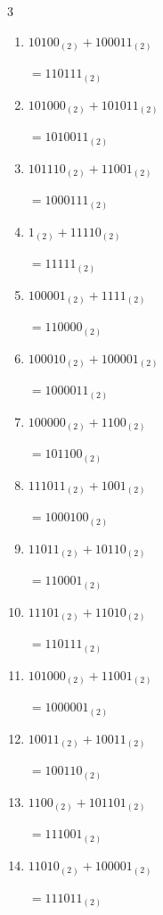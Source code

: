\begin{multicols}{3}
\begin{enumerate}
  \item $10100_{(2)} + 100011_{(2)}$

        $=110111_{(2)}$

  \item $101000_{(2)} + 101011_{(2)}$

        $=1010011_{(2)}$

  \item $101110_{(2)} + 11001_{(2)}$

        $=1000111_{(2)}$

  \item $1_{(2)} + 11110_{(2)}$

        $=11111_{(2)}$

  \item $100001_{(2)} + 1111_{(2)}$

        $=110000_{(2)}$

  \item $100010_{(2)} + 100001_{(2)}$

        $=1000011_{(2)}$

  \item $100000_{(2)} + 1100_{(2)}$

        $=101100_{(2)}$

  \item $111011_{(2)} + 1001_{(2)}$

        $=1000100_{(2)}$

\columnbreak %

  \item $11011_{(2)} + 10110_{(2)}$

        $=110001_{(2)}$

  \item $11101_{(2)} + 11010_{(2)}$

        $=110111_{(2)}$

  \item $101000_{(2)} + 11001_{(2)}$

        $=1000001_{(2)}$

  \item $10011_{(2)} + 10011_{(2)}$

        $=100110_{(2)}$

  \item $1100_{(2)} + 101101_{(2)}$

        $=111001_{(2)}$

  \item $11010_{(2)} + 100001_{(2)}$

        $=111011_{(2)}$


\end{enumerate}
\end{multicols}
